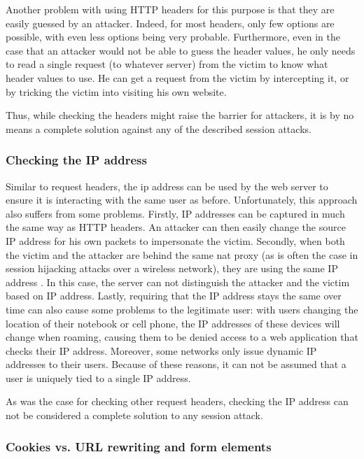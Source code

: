 Another problem with using HTTP headers for this purpose is that they are easily guessed by an attacker. Indeed, for most headers, only few options are possible, with even less options being very probable. Furthermore, even in the case that an attacker would not be able to guess the header values, he only needs to read a single request (to whatever server) from the victim to know what header values to use. He can get a request from the victim by intercepting it, or by tricking the victim into visiting his own website.

Thus, while checking the headers might raise the barrier for attackers, it is by no means a complete solution against any of the described session attacks.

\subsubsection{Checking the IP address}

Similar to request headers, the \gls{ip} address can be used by the web server to ensure it is interacting with the same user as before. Unfortunately, this approach also suffers from some problems. Firstly, IP addresses can be captured in much the same way as HTTP headers. An attacker can then easily change the source IP address for his own packets to impersonate the victim. Secondly, when both the victim and the attacker are behind the same \gls{nat} proxy (as is often the case in session hijacking attacks over a wireless network), they are using the same IP address \cite{Johns2011}. In this case, the server can not distinguish the attacker and the victim based on IP address. Lastly, requiring that the IP address stays the same over time can also cause some problems to the legitimate user: with users changing the location of their notebook or cell phone, the IP addresses of these devices will change when roaming, causing them to be denied access to a web application that checks their IP address. Moreover, some networks only issue dynamic IP addresses to their users. Because of these reasons, it can not be assumed that a user is uniquely tied to a single IP address.

As was the case for checking other request headers, checking the IP address can not be considered a complete solution to any session attack.

\subsubsection{Cookies vs. URL rewriting and form elements}\label{url-vs-cookies}

